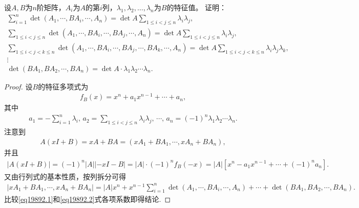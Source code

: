 \documentclass[../../main.tex]{subfiles}
\begin{document}
\begin{example}
设\( A,B \)为\( n \)阶矩阵，\( A_i \)为\( A \)的第\( i \)列，\( \lambda_1,\lambda_2,\dots,\lambda_n \)为\( B \)的特征值。
证明：
\begin{gather*}
\sum_{i=1}^n{\det \left( A_1,\cdots ,BA_i,\cdots ,A_n \right)}=\det A\sum_{1\le i<j\le n}{\lambda _i\lambda _j},
\\
\sum_{1\le i<j\le n}{\det \left( A_1,\cdots ,BA_i,\cdots ,BA_j,\cdots ,A_n \right)}=\det A\sum_{1\le i<j\le n}{\lambda _i\lambda _j},
\\
\sum_{1\le i<j<k\le n}{\det \left( A_1,\cdots ,BA_i,\cdots ,BA_j,\cdots ,BA_k,\cdots ,A_n \right)}=\det A\sum_{1\le i<j<k\le n}{\lambda _i\lambda _j\lambda _k},
\\
\vdots 
\\
\det \left( BA_1,BA_2,\cdots ,BA_n \right) =\det A\cdot \lambda _1\lambda _2\cdots \lambda _n.
\end{gather*}
\end{example}
\begin{proof}
设\( B \)的特征多项式为
\begin{align*}
f_B(x) = x^n + a_1x^{n-1} + \cdots + a_n,
\end{align*}
其中
\begin{align*}
a_1 = -\sum_{i=1}^n \lambda_i,\, a_2 = \sum_{1 \leq i < j \leq n} \lambda_i\lambda_j,\, \cdots,\, a_n = (-1)^n \lambda_1\lambda_2\cdots\lambda_n.
\end{align*}
注意到
\begin{align*}
A(xI + B) = xA + BA = (xA_1 + BA_1, \cdots, xA_n + BA_n),
\end{align*}
并且
\begin{align}
|A(xI + B)| = (-1)^n |A| |-xI - B| = |A| \cdot (-1)^n f_B(-x) = |A| \left[ x^n - a_1x^{n-1} + \cdots + (-1)^n a_n \right]. \label{eq19892.1}
\end{align}
又由行列式的基本性质，按列拆分可得
\begin{align}
|xA_1 + BA_1, \cdots, xA_n + BA_n| = |A|x^n + x^{n-1} \sum_{i=1}^n \det(A_1, \cdots, BA_i, \cdots, A_n) + \cdots + \det(BA_1, BA_2, \cdots, BA_n). \label{eq19892.2}
\end{align}
比较\eqref{eq19892.1}和\eqref{eq19892.2}式各项系数即得结论.

\end{proof}
\end{document}
